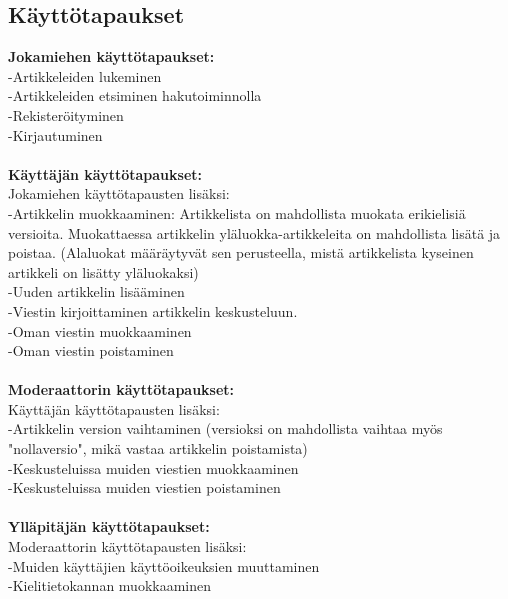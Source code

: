 \documentclass[12pt]{article}
\begin{document}
    \subsection{Käyttötapaukset}
      \textbf{Jokamiehen käyttötapaukset:} \\
        -Artikkeleiden lukeminen \\
        -Artikkeleiden etsiminen hakutoiminnolla \\
        -Rekisteröityminen \\
        -Kirjautuminen \\ \\
      \textbf{Käyttäjän käyttötapaukset:} \\
        Jokamiehen käyttötapausten lisäksi:\\
        -Artikkelin muokkaaminen: Artikkelista on mahdollista muokata erikielisiä versioita. Muokattaessa artikkelin yläluokka-artikkeleita on mahdollista lisätä ja poistaa. (Alaluokat määräytyvät sen perusteella, mistä artikkelista kyseinen artikkeli on lisätty yläluokaksi) \\
        -Uuden artikkelin lisääminen \\
        -Viestin kirjoittaminen artikkelin keskusteluun. \\
        -Oman viestin muokkaaminen \\
        -Oman viestin poistaminen \\ \\
      \textbf{Moderaattorin käyttötapaukset:}\\
        Käyttäjän käyttötapausten lisäksi:\\
        -Artikkelin version vaihtaminen (versioksi on mahdollista vaihtaa myös "nollaversio", mikä vastaa artikkelin poistamista) \\
        -Keskusteluissa muiden viestien muokkaaminen \\
        -Keskusteluissa muiden viestien poistaminen \\ \\
      \textbf{Ylläpitäjän käyttötapaukset:}\\
        Moderaattorin käyttötapausten lisäksi:\\
        -Muiden käyttäjien käyttöoikeuksien muuttaminen \\
        -Kielitietokannan muokkaaminen \\

  \newpage
\end{document}
